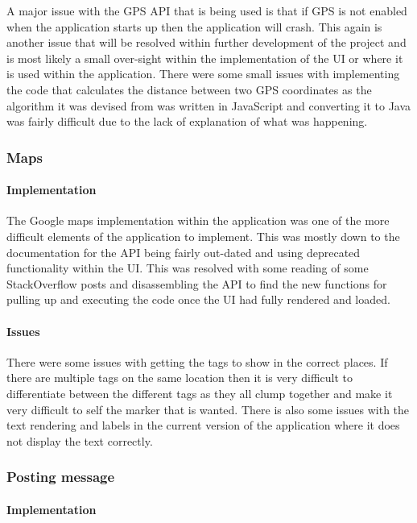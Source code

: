 A major issue with the GPS API that is being used is that if GPS is not enabled when the application starts up then the application will crash. This again is another issue that will be resolved within further development of the project and is most likely a small over-sight within the implementation of the UI or where it is used within the application. There were some small issues with implementing the code that calculates the distance between two GPS coordinates as the algorithm it was devised from was written in JavaScript and converting it to Java was fairly difficult due to the lack of explanation of what was happening.


\subsubsection{Maps}

\paragraph*{Implementation}

The Google maps implementation within the application was one of the more difficult elements of the application to implement. This was mostly down to the documentation for the API being fairly out-dated and using deprecated functionality within the UI. This was resolved with some reading of some StackOverflow posts and disassembling the API to find the new functions for pulling up and executing the code once the UI had fully rendered and loaded. 

\paragraph*{Issues}

There were some issues with getting the tags to show in the correct places. If there are multiple tags on the same location then it is very difficult to differentiate between the different tags as they all clump together and make it very difficult to self the marker that is wanted. There is also some issues with the text rendering and labels in the current version of the application where it does not display the text correctly.

\subsubsection{Posting message}

\paragraph*{Implementation}


